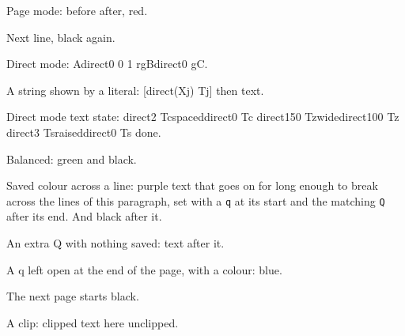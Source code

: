 \documentclass{article}
\begin{document}
\noindent Page mode: before after, red.
\par\noindent Next line, black again.
\newpage

\noindent Direct mode: A\pdfliteral direct{0 0 1 rg}B\pdfliteral direct{0 g}C.
\newpage

\noindent A string shown by a literal: [\pdfliteral direct{(Xj) Tj}] then text.
\newpage

\noindent Direct mode text state: \pdfliteral direct{2 Tc}spaced\pdfliteral direct{0 Tc}
\pdfliteral direct{150 Tz}wide\pdfliteral direct{100 Tz}
\pdfliteral direct{3 Ts}raised\pdfliteral direct{0 Ts} done.
\newpage

\noindent Balanced: green and black.
\newpage

\noindent Saved colour across a line: purple text that goes on
for long enough to break across the lines of this paragraph, set with
a \verb|q| at its start and the matching \verb|Q| after its end.
And black after it.
\newpage

\noindent An extra Q with nothing saved: text after it.
\newpage

\noindent A q left open at the end of the page, with a colour: blue.
\newpage

\noindent The next page starts black.
\newpage

\noindent A clip: clipped text here unclipped.
\end{document}
